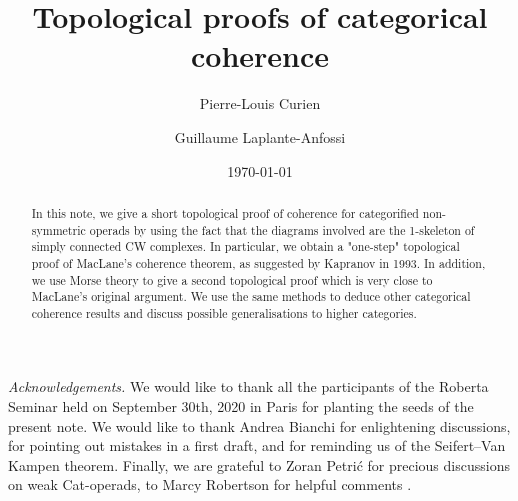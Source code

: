 \documentclass[11pt]{amsart}
\title{Topological proofs of categorical coherence}
\author{Pierre-Louis Curien}
\author{Guillaume Laplante-Anfossi}
\date{\today}
\begin{document}
\begin{abstract}
In this note, we give a short topological proof of coherence for categorified non-symmetric operads by using the fact that the diagrams involved are the 1-skeleton of simply connected CW complexes. 
In particular, we obtain a "one-step" topological proof of MacLane's coherence theorem, as suggested by Kapranov in 1993. 
In addition, we use Morse theory to give a second topological proof which is very close to MacLane's original argument. 
We use the same methods to deduce other categorical coherence results and discuss possible generalisations to higher categories. 
\end{abstract}

\maketitle



\setcounter{tocdepth}{1}






\bigskip

\emph{Acknowledgements.}   
We would like to thank all the participants of the Roberta Seminar held on September 30th, 2020 in Paris for planting the seeds of the present note.  
We would like to thank Andrea Bianchi for enlightening discussions, for pointing out mistakes in a first draft, and for reminding us of the Seifert--Van Kampen theorem. 
Finally, we are grateful to Zoran Petri{\'c} for precious discussions on weak Cat-operads, to Marcy Robertson  for helpful comments .





\end{document}
